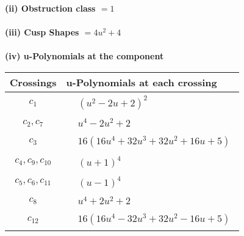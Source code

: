 \documentclass[1p]{elsarticle_modified}
\theoremstyle{definition}
\begin{document}
\flushleft \textbf{(ii) Obstruction class $= 1$}\\~\\
\flushleft \textbf{(iii) Cusp Shapes $= 4 u^2+4$}\\~\\
\newpage\renewcommand{\arraystretch}{1}
\flushleft \textbf{(iv) u-Polynomials at the component}\newline \\
\begin{tabular}{m{50pt}|m{274pt}}
Crossings & \hspace{64pt}u-Polynomials at each crossing \\
\hline $$\begin{aligned}c_{1}\end{aligned}$$&$\begin{aligned}
&(u^2-2 u+2)^2
\end{aligned}$\\
\hline $$\begin{aligned}c_{2},c_{7}\end{aligned}$$&$\begin{aligned}
&u^4-2 u^2+2
\end{aligned}$\\
\hline $$\begin{aligned}c_{3}\end{aligned}$$&$\begin{aligned}
&16(16 u^4+32 u^3+32 u^2+16 u+5)
\end{aligned}$\\
\hline $$\begin{aligned}c_{4},c_{9},c_{10}\end{aligned}$$&$\begin{aligned}
&(u+1)^4
\end{aligned}$\\
\hline $$\begin{aligned}c_{5},c_{6},c_{11}\end{aligned}$$&$\begin{aligned}
&(u-1)^4
\end{aligned}$\\
\hline $$\begin{aligned}c_{8}\end{aligned}$$&$\begin{aligned}
&u^4+2 u^2+2
\end{aligned}$\\
\hline $$\begin{aligned}c_{12}\end{aligned}$$&$\begin{aligned}
&16(16 u^4-32 u^3+32 u^2-16 u+5)
\end{aligned}$\\
\hline
\end{tabular}\\~\\
\end{document}
